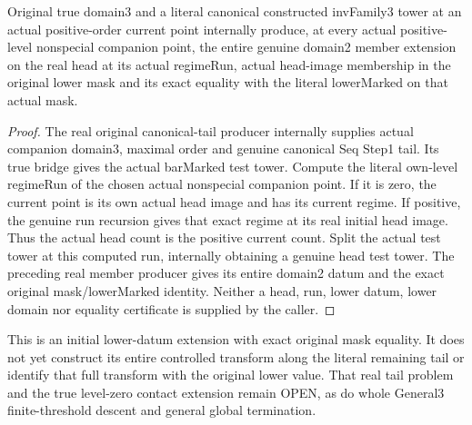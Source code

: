 \begin{theorem}
\label{hir:member-lower-extension-actual-general-three-consumer}
\leanok
Original true domain3 and a literal canonical constructed invFamily3 tower at
an actual positive-order current point internally produce, at every actual
positive-level nonspecial companion point, the entire genuine domain2 member
extension on the real head at its actual regimeRun, actual head-image membership
in the original lower mask and its exact equality with the literal lowerMarked
on that actual mask.
\end{theorem}
\begin{proof}
The real original canonical-tail producer internally supplies actual companion
domain3, maximal order and genuine canonical Seq Step1 tail. Its true bridge
gives the actual barMarked test tower. Compute the literal own-level regimeRun
of the chosen actual nonspecial companion point. If it is zero, the current
point is its own actual head image and has its current regime. If positive,
the genuine run recursion gives that exact regime at its real initial head
image. Thus the actual head count is the positive current count. Split the
actual test tower at this computed run, internally obtaining a genuine head
test tower. The preceding real member producer gives its entire domain2 datum
and the exact original mask/lowerMarked identity. Neither a head, run, lower
datum, lower domain nor equality certificate is supplied by the caller.
\end{proof}

\begin{remark}
This is an initial lower-datum extension with exact original mask equality.
It does not yet construct its entire controlled transform along the literal
remaining tail or identify that full transform with the original lower value.
That real tail problem and the true level-zero contact extension remain OPEN,
as do whole General3 finite-threshold descent and general global termination.
\end{remark}
